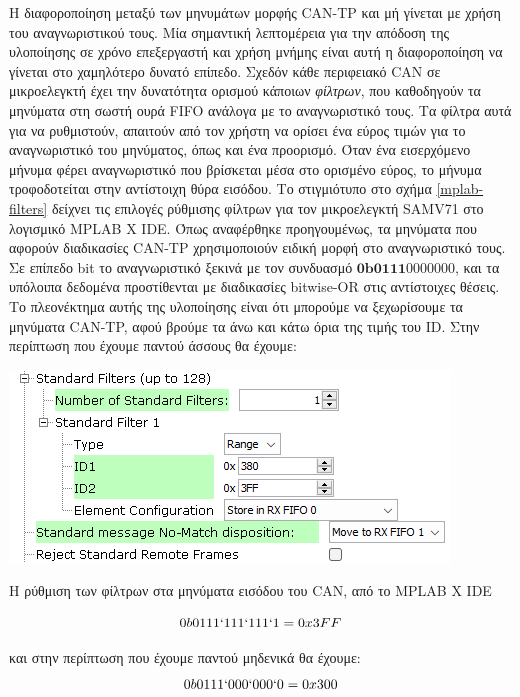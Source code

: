 \documentclass[a4paper,nobib,justified]{tufte-book}
\begin{document}
Η διαφοροποίηση μεταξύ των μηνυμάτων μορφής CAN-TP και μή γίνεται με χρήση του αναγνωριστικού τους. Μία σημαντική λεπτομέρεια για την απόδοση της υλοποίησης σε χρόνο επεξεργαστή και χρήση μνήμης είναι αυτή η διαφοροποίηση να γίνεται στο χαμηλότερο δυνατό επίπεδο. Σχεδόν κάθε περιφειακό CAN σε μικροελεγκτή έχει την δυνατότητα ορισμού κάποιων \textit{φίλτρων}, που καθοδηγούν τα μηνύματα στη σωστή ουρά FIFO ανάλογα με το αναγνωριστικό τους. Τα φίλτρα αυτά για να ρυθμιστούν, απαιτούν από τον χρήστη να ορίσει ένα εύρος τιμών για το αναγνωριστικό του μηνύματος, όπως και ένα προορισμό. Όταν ένα εισερχόμενο μήνυμα φέρει αναγνωριστικό που βρίσκεται μέσα στο ορισμένο εύρος, το μήνυμα τροφοδοτείται στην αντίστοιχη θύρα εισόδου. Το στιγμιότυπο στο σχήμα \ref{mplab-filters} δείχνει τις επιλογές ρύθμισης φίλτρων για τον μικροελεγκτή SAMV71 στο λογισμικό MPLAB X IDE. Όπως αναφέρθηκε προηγουμένως, τα μηνύματα που αφορούν διαδικασίες CAN-TP χρησιμοποιούν ειδική μορφή στο αναγνωριστικό τους. Σε επίπεδο bit το αναγνωριστικό ξεκινά με τον συνδυασμό $\textbf{0b0111}0000000$, και τα υπόλοιπα δεδομένα προστίθενται με διαδικασίες bitwise-OR στις αντίστοιχες θέσεις. Το πλεονέκτημα αυτής της υλοποίησης είναι ότι μπορούμε να ξεχωρίσουμε τα μηνύματα CAN-TP, αφού βρούμε τα άνω και κάτω όρια της τιμής του ID. Στην περίπτωση που έχουμε παντού άσσους θα έχουμε:

\begin{marginfigure}
	\includegraphics[width=0.8\linewidth]{media/images/mplab-filters.png}
	\label{mplab-filters}
	\caption{Η ρύθμιση των φίλτρων στα μηνύματα εισόδου του CAN, από το MPLAB X IDE}
\end{marginfigure}

\begin{equation}
0b0111`111`111`1 = 0x3FF
\end{equation}

και στην περίπτωση που έχουμε παντού μηδενικά θα έχουμε:
\begin{equation}
0b0111`000`000`0 = 0x300
\end{equation}
\end{document}
